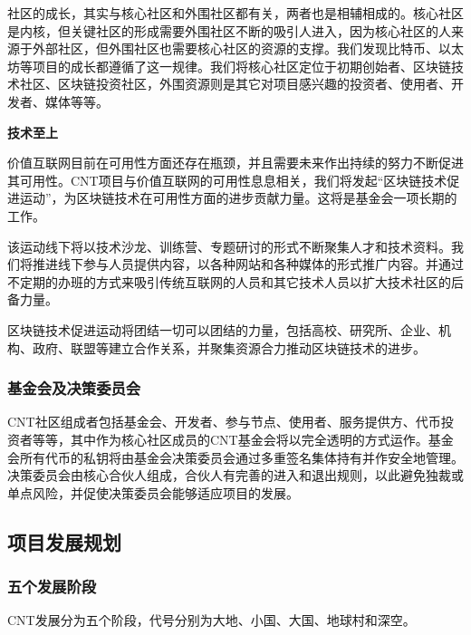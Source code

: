 \documentclass[a4paper,12pt]{article}
\begin{document}
社区的成长，其实与核心社区和外围社区都有关，两者也是相辅相成的。核心社区是内核，但关键社区的形成需要外围社区不断的吸引人进入，因为核心社区的人来源于外部社区，但外围社区也需要核心社区的资源的支撑。我们发现比特币、以太坊等项目的成长都遵循了这一规律。我们将核心社区定位于初期创始者、区块链技术社区、区块链投资社区，外围资源则是其它对项目感兴趣的投资者、使用者、开发者、媒体等等。

\textbf{技术至上}

价值互联网目前在可用性方面还存在瓶颈，并且需要未来作出持续的努力不断促进其可用性。CNT项目与价值互联网的可用性息息相关，我们将发起“区块链技术促进运动”，为区块链技术在可用性方面的进步贡献力量。这将是基金会一项长期的工作。

该运动线下将以技术沙龙、训练营、专题研讨的形式不断聚集人才和技术资料。我们将推进线下参与人员提供内容，以各种网站和各种媒体的形式推广内容。并通过不定期的办班的方式来吸引传统互联网的人员和其它技术人员以扩大技术社区的后备力量。

区块链技术促进运动将团结一切可以团结的力量，包括高校、研究所、企业、机构、政府、联盟等建立合作关系，并聚集资源合力推动区块链技术的进步。

\subsubsection{基金会及决策委员会}
CNT社区组成者包括基金会、开发者、参与节点、使用者、服务提供方、代币投资者等等，其中作为核心社区成员的CNT基金会将以完全透明的方式运作。基金会所有代币的私钥将由基金会决策委员会通过多重签名集体持有并作安全地管理。决策委员会由核心合伙人组成，合伙人有完善的进入和退出规则，以此避免独裁或单点风险，并促使决策委员会能够适应项目的发展。


\subsection{项目发展规划}
\subsubsection{五个发展阶段}

CNT发展分为五个阶段，代号分别为大地、小国、大国、地球村和深空。
\end{document}

